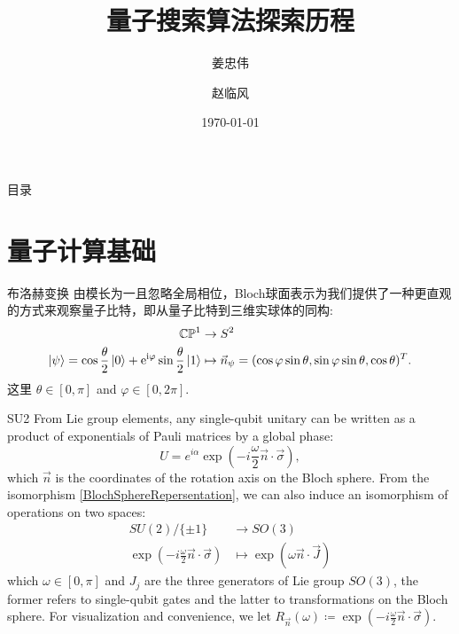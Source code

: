\documentclass{beamer}
\author{姜忠伟\and 赵临风}
\institute{西北大学物理学院}
\title{量子搜索算法探索历程}
\date{\today}
\begin{document}
\kaishu
\maketitle

\begin{frame}{目录}
    \tableofcontents[
        sectionstyle=show,
        subsectionstyle=show/shaded/hide,
        subsubsectionstyle=show/shaded/hide
    ]
\end{frame}



\section{量子计算基础}

\begin{frame}{布洛赫变换}
    由模长为一且忽略全局相位，Bloch球面表示为我们提供了一种更直观的方式来观察量子比特，即从量子比特到三维实球体的同构:
    \begin{equation*}\label{BlochSphereRepersentation}
        \begin{split}
            \mathbb{C}\mathbb{P}^{1}                                                                              & \to S^{2}                                                                            \\
            \ket{\psi} = \cos \frac{\theta}{2}\ket{0} + \mathrm{e}^{\mathrm{i}\varphi}\sin\frac{\theta}{2}\ket{1} & \mapsto \vec{n}_{\psi}=(\cos\varphi\sin\theta,\sin\varphi\sin\theta,\cos\theta)^{T}.
        \end{split}
    \end{equation*}
    这里 $\theta\in\left[0,\pi\right]$ and $\varphi\in\left[0,2\pi\right]$.
\end{frame}

\begin{frame}{SU2}
    From Lie group elements, any single-qubit unitary can be written as a product of exponentials of Pauli matrices by a global phase:
    \begin{equation}
        U = e^{i\alpha}\exp\left(-i\frac{\omega}{2}\vec{n}\cdot\vec{\sigma}\right),
    \end{equation}
    which $\vec{n}$ is the coordinates of the rotation axis on the Bloch sphere.
    From the isomorphism \ref{BlochSphereRepersentation}, we can also induce an isomorphism of operations on two spaces:
    \begin{equation}
        \begin{split}
            SU(2)/\{\pm 1\}                                             & \to SO(3)
            \\
            \exp\left(-i\frac{\omega}{2}\vec{n}\cdot\vec{\sigma}\right) & \mapsto \exp\left(\omega\vec{n}\cdot\vec{J}\right)
        \end{split}
    \end{equation}
    which $\omega\in\left[0,\pi\right]$ and $J_{j}$ are the three generators of Lie group $SO(3)$, the former refers to single-qubit gates and the latter to transformations on the Bloch sphere. For visualization and convenience, we let $R_{\vec{n}}(\omega) \coloneqq \exp\left(-i\frac{\omega}{2}\vec{n}\cdot\vec{\sigma}\right)$.
\end{frame}
\end{document}
